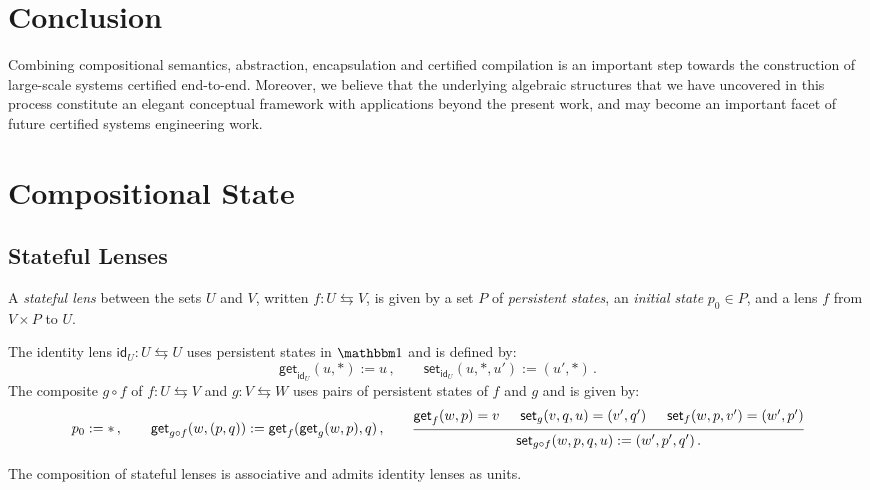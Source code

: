 \documentclass[acmsmall,screen,review,anonymous,nonacm]{acmart}
\newcommand{\kw}[1]{\ensuremath{ \mathsf{#1} }}
\begin{document}

\section{Conclusion} \label{sec:conclusion} %

Combining compositional semantics,
abstraction,
encapsulation and certified compilation
is an important step towards
the construction of large-scale systems certified end-to-end.
Moreover,
we believe that
the underlying algebraic structures that we have uncovered
in this process
constitute an elegant conceptual framework
with applications beyond the present work,
and may become an important facet of
future certified systems engineering work.




\section{Compositional State} %

\subsection{Stateful Lenses}

\begin{definition}
A \emph{stateful lens} between the sets $U$ and $V$,
written $f : U \leftrightarrows V$,
is given by a set $P$ of \emph{persistent states},
an \emph{initial state} $p_0 \in P$,
and a lens $f$ from $V \times P$ to $U$.

The identity lens $\kw{id}_U : U \leftrightarrows U$
uses persistent states in $\mathbbm1$ and is defined by:
\[
  \kw{get}_{\kw{id}_U}(u, *) := u
  \,,
  \qquad
  \kw{set}_{\kw{id}_U}(u, *, u') := (u', *)
  \,.
\]
The composite $g \circ f$ of
$f : U \leftrightarrows V$ and
$g : V \leftrightarrows W$
uses pairs of persistent states of $f$ and $g$ and
is given by:
\[
  p_0 := {*}
  \,,
  \qquad
  \kw{get}_{g \circ f}(w, (p, q)) := \kw{get}_f(\kw{get}_g(w, p), q)
  \,,
  \qquad
  \begin{prooftree}
    \hypo{\kw{get}_f(w, p) = v}
    \hypo{\kw{set}_g(v, q, u) = (v', q')}
    \hypo{\kw{set}_f(w, p, v') = (w', p')}
    \infer3{\kw{set}_{g \circ f}(w, p, q, u) := (w', p', q') \,.}
  \end{prooftree}
\]
\end{definition}

\begin{theorem}
The composition of stateful lenses is associative
and admits identity lenses as units.
\end{theorem}
\end{document}
